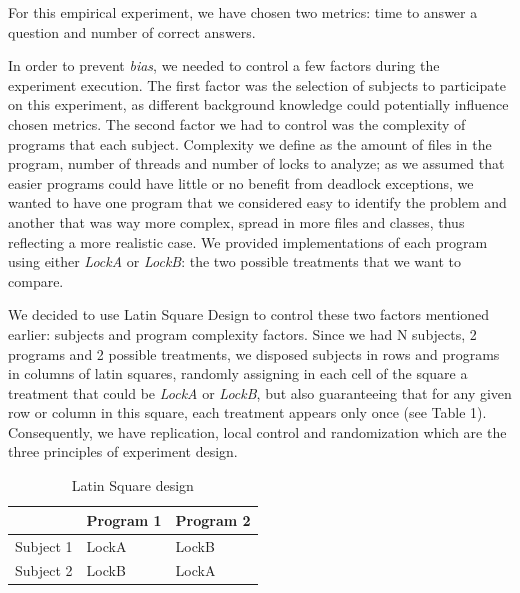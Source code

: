 For this empirical experiment, we have chosen two metrics: time to answer a question and number of correct answers.

In order to prevent \emph{bias}, we needed to control a few factors during the experiment execution. The first factor was the selection of subjects to participate on this experiment, as different background knowledge could potentially influence chosen metrics. The second factor we had to control was the complexity of programs that each subject. Complexity we define as the amount of files in the program, number of threads and number of locks to analyze; as we assumed that easier programs could have little or no benefit from deadlock exceptions, we wanted to have one program that we considered easy to identify the problem and another that was way more complex, spread in more files and classes, thus reflecting a more realistic case. We provided implementations of each program using either \emph{LockA} or \emph{LockB}: the two possible treatments that we want to compare.

We decided to use Latin Square Design to control these two factors mentioned earlier: subjects and program complexity factors. Since we had N subjects, 2 programs and 2 possible treatments, we disposed subjects in rows and programs in columns of latin squares, randomly assigning in each cell of the square a treatment that could be \emph{LockA} or \emph{LockB}, but also guaranteeing that for any given row or column in this square, each treatment appears only once (see Table 1). Consequently, we have replication, local control and randomization which are the three principles of experiment design. %

\begin{table}
\begin{center}
\caption{Latin Square design}
\begin{tabular}{|l|l|l|}
\hline
 & Program 1 & Program 2\\
\hline
Subject 1 & LockA & LockB\\
Subject 2 & LockB & LockA\\
\hline
\end{tabular}
\end{center}
\end{table}

